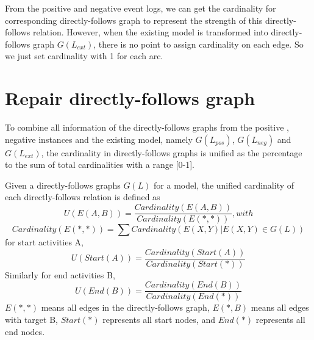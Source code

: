 From the positive and negative event logs, we can get the cardinality for corresponding directly-follows graph to represent the strength of this directly-follows relation. However, when the existing model is transformed into  directly-follows graph $G(L_{ext})$, there is no point to assign cardinality on each edge. So we just set cardinality with 1 for each arc. 
\section{Repair directly-follows graph}
To combine all information of the directly-follows graphs from the positive , negative instances and the existing model, namely $G(L_{pos})$, $G(L_{neg})$ and $G(L_{ext})$, the cardinality in directly-follows graphs is unified as the percentage to the sum of total cardinalities with a range [0-1].
\begin{definition}
Given a directly-follows graphs $G(L)$ for a model, the unified cardinality of each directly-follows relation is defined as \[ U(E(A,B)) = \frac{Cardinality(E(A,B))}{Cardinality(E(*,*))}, with \]
	\[ Cardinality(E(*,*))=\sum{Cardinality(E(X,Y) \vert E(X,Y) \in G(L))}  \] 
	for start activities A, 
	\[ U(Start(A)) = \frac{Cardinality(Start(A))}{Cardinality(Start(*))} \]
	Similarly for end activities B,
	\[ U(End(B)) = \frac{Cardinality(End(B))}{Cardinality(End(*))} \]
$E(*,*)$ means all edges in the directly-follows graph, $E(*,B)$ means all edges with target B, $Start(*)$ represents all start nodes, and $End(*)$ represents all end nodes. 
\end{definition}

